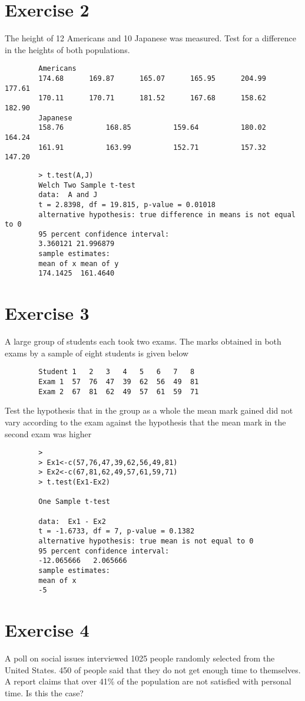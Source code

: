 \documentclass[a4paper,12pt]{article}
\begin{document}
\begin{itemize}
\begin{itemize}
		\section{Exercise 2} 
		The height of 12 Americans and 10 Japanese was measured. Test for a difference in the heights of both populations.
		\begin{verbatim}
		Americans
		174.68   	169.87 	   	165.07    	165.95 		204.99 		177.61 	
		170.11 	 	170.71 	   	181.52 		167.68 		158.62 		182.90
		Japanese
		158.76  		168.85  		159.64  		180.02  		164.24
		161.91  		163.99  		152.71  		157.32  		147.20
		\end{verbatim}
		\begin{verbatim}
		> t.test(A,J)
		Welch Two Sample t-test
		data:  A and J
		t = 2.8398, df = 19.815, p-value = 0.01018
		alternative hypothesis: true difference in means is not equal to 0
		95 percent confidence interval:
		3.360121 21.996879
		sample estimates:
		mean of x mean of y
		174.1425  161.4640
		\end{verbatim}
		
		\section{Exercise 3}
		
		A large group of students each took two exams. The marks obtained in both exams by a sample of eight students is given below
		
		\begin{verbatim}
		Student	1	2	3	4	5	6	7	8
		Exam 1	57	76	47	39	62	56	49	81
		Exam 2	67	81	62	49	57	61	59	71
		\end{verbatim}
		Test the hypothesis that in the group as a whole the mean mark gained did not vary according to the exam against the hypothesis that the mean mark in the second exam was higher
		\begin{verbatim}
		>
		> Ex1<-c(57,76,47,39,62,56,49,81)
		> Ex2<-c(67,81,62,49,57,61,59,71)
		> t.test(Ex1-Ex2)
		
		One Sample t-test
		
		data:  Ex1 - Ex2
		t = -1.6733, df = 7, p-value = 0.1382
		alternative hypothesis: true mean is not equal to 0
		95 percent confidence interval:
		-12.065666   2.065666
		sample estimates:
		mean of x
		-5
		\end{verbatim}
		
		\section{Exercise 4}
		A poll on social issues interviewed 1025 people randomly selected from the United States. 450 of people said that they do not get enough time to themselves. A report claims that over 41\% of the population are not satisfied with personal time. Is this the case?
		

\end{itemize}
\end{itemize}
\end{document}
